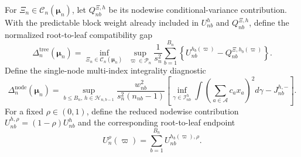 For \(\Xi_n\in\mathcal C_n(\boldsymbol\mu_n)\), let \(Q_{nb}^{\Xi,h}\) be its nodewise conditional-variance contribution. With the predictable block weight already included in \(U_{nb}^{h}\) and \(Q_{nb}^{\Xi,h}\), define the normalized root-to-leaf compatibility gap
\[
\Delta_n^{\mathrm{tree}}(\boldsymbol\mu_n)=\inf_{\Xi_n\in\mathcal C_n(\boldsymbol\mu_n)}\ \sup_{\varpi\in\mathcal P_n}\frac1{s_n^2}\sum_{b=1}^{B_n}\left\{U_{nb}^{h_b(\varpi)}-Q_{nb}^{\Xi,h_b(\varpi)}\right\}.
\]
Define the single-node multi-index integrality diagnostic
\[
\Delta_n^{\mathrm{node}}(\boldsymbol\mu_n)=\sup_{b\le B_n,\,h\in\mathcal H_{n,b-1}}\frac{w_{nb}^2}{s_n^2(n_{nb}-1)}\left[\inf_{\gamma\in\mathcal I_{nb}^{h}}\int\left(\sum_{a\in\mathcal A}c_ax_a\right)^2d\gamma-J_{nb}^{h,-}\right].
\]
For a fixed \(\rho\in(0,1)\), define the reduced nodewise contribution \(U_{nb}^{h,\rho}=(1-\rho)U_{nb}^{h}\) and the corresponding root-to-leaf endpoint
\[
U_n^{\rho}(\varpi)=\sum_{b=1}^{B_n}U_{nb}^{h_b(\varpi),\rho}.
\]